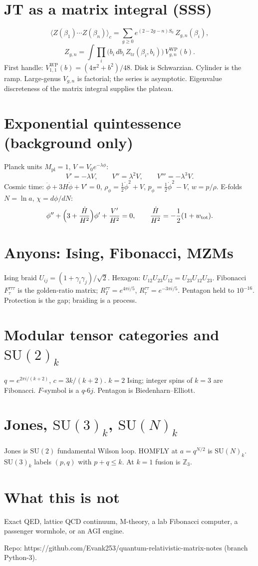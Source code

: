 \documentclass[11pt]{article}
\begin{document}
\section{JT as a matrix integral (SSS)}
\[
\langle Z(\beta_1)\cdots Z(\beta_n)\rangle_c
=\sum_{g\ge 0}e^{(2-2g-n)S_0}\,Z_{g,n}(\beta_i),
\]
\[
Z_{g,n}=\int\prod_i\bigl(b_i\,db_i\,Z_{\mathrm{tr}}(\beta_i,b_i)\bigr)\,V_{g,n}^{\mathrm{WP}}(b).
\]
First handle: $V_{1,1}^{\mathrm{WP}}(b)=(4\pi^2+b^2)/48$. Disk is Schwarzian. Cylinder is the ramp. Large-genus $V_{g,n}$ is factorial; the series is asymptotic. Eigenvalue discreteness of the matrix integral supplies the plateau.

\section{Exponential quintessence (background only)}

Planck units $M_{\mathrm{pl}}=1$, $V=V_0 e^{-\lambda\phi}$:
\[
V'=-\lambda V,\qquad V''=\lambda^2 V,\qquad V'''=-\lambda^3 V.
\]
Cosmic time: $\ddot\phi+3H\dot\phi+V'=0$, $\rho_\phi=\tfrac12\dot\phi^2+V$, $p_\phi=\tfrac12\dot\phi^2-V$, $w=p/\rho$.
E-folds $N=\ln a$, $\chi=d\phi/dN$:
\[
\phi''+\Bigl(3+\frac{\dot H}{H^2}\Bigr)\phi'+\frac{V'}{H^2}=0,
\qquad
\frac{\dot H}{H^2}=-\frac12(1+w_{\mathrm{tot}}).
\]

\section{Anyons: Ising, Fibonacci, MZMs}

Ising braid $U_{ij}=(1+\gamma_i\gamma_j)/\sqrt{2}$. Hexagon: $U_{12}U_{23}U_{12}=U_{23}U_{12}U_{23}$. Fibonacci $F^{\tau\tau\tau}_\tau$ is the golden-ratio matrix; $R^{\tau\tau}_I=e^{4\pi i/5}$, $R^{\tau\tau}_\tau=e^{-3\pi i/5}$. Pentagon held to $10^{-16}$. Protection is the gap; braiding is a process.

\section{Modular tensor categories and $\mathrm{SU}(2)_k$}

$q=e^{2\pi i/(k+2)}$, $c=3k/(k+2)$. $k=2$ Ising; integer spins of $k=3$ are Fibonacci. $F$-symbol is a $q$-$6j$. Pentagon is Biedenharn--Elliott.

\section{Jones, $\mathrm{SU}(3)_k$, $\mathrm{SU}(N)_k$}

Jones is $\mathrm{SU}(2)$ fundamental Wilson loop. HOMFLY at $a=q^{N/2}$ is $\mathrm{SU}(N)_k$. $\mathrm{SU}(3)_k$ labels $(p,q)$ with $p+q\le k$. At $k=1$ fusion is $\mathbb{Z}_3$.

\section{What this is not}

Exact QED, lattice QCD continuum, M-theory, a lab Fibonacci computer, a passenger wormhole, or an AGI engine.

Repo: https://github.com/Evank253/quantum-relativistic-matrix-notes (branch Python-3).
\end{document}

